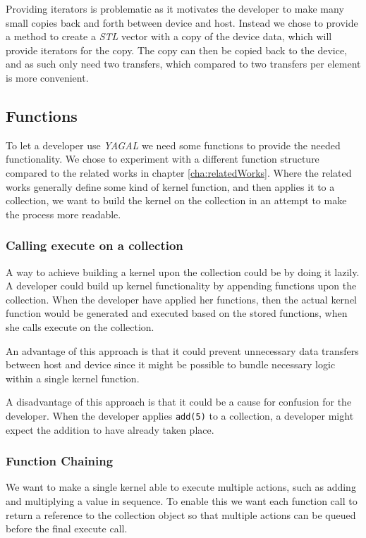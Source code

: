 Providing iterators is problematic as it motivates the developer to make many small copies back and forth between device and host. Instead we chose to provide a method to create a \textit{STL} vector with a copy of the device data, which will provide iterators for the copy. The copy can then be copied back to the device, and as such only need two transfers, which compared to two transfers per element is more convenient.

\subsection{Functions}
To let a developer use \textit{YAGAL} we need some functions to provide the needed functionality. We chose to experiment with a different function structure compared to the related works in chapter \ref{cha:relatedWorks}. Where the related works generally define some kind of kernel function, and then applies it to a collection, we want to build the kernel on the collection in an attempt to make the process more readable.

\subsubsection{Calling execute on a collection}
A way to achieve building a kernel upon the collection could be by doing it lazily. A developer could build up kernel functionality by appending functions upon the collection. When the developer have applied her functions, then the actual kernel function would be generated and executed based on the stored functions, when she calls execute on the collection.

An advantage of this approach is that it could prevent unnecessary data transfers between host and device since it might be possible to bundle necessary logic within a single kernel function. 

A disadvantage of this approach is that it could be a cause for confusion for the developer. When the developer applies \texttt{add(5)} to a collection, a developer might expect the addition to have already taken place.

\subsubsection{Function Chaining}
We want to make a single kernel able to execute multiple actions, such as adding and multiplying a value in sequence. To enable this we want each function call to return a reference to the collection object so that multiple actions can be queued before the final execute call.

